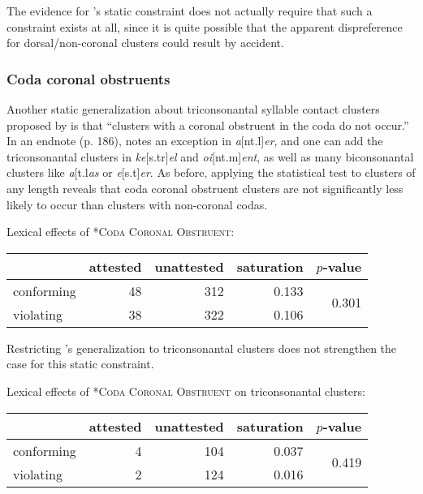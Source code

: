 \noindent
The evidence for \citeauthor{Pierrehumbert1994}'s static constraint does not actually require that such a constraint exists at all, since it is quite possible that the apparent dispreference for dorsal/non-coronal clusters could result by accident.

\subsubsection{Coda coronal obstruents}

Another static generalization about triconsonantal syllable contact clusters proposed by \citet[][175]{Pierrehumbert1994} is that  ``clusters with a coronal obstruent in the coda do not occur.'' In an endnote (p. 186), \citet{Pierrehumbert1994} notes an exception in \emph{a}[nt.l]\emph{er}, and one can add the triconsonantal clusters in \emph{ke}[s.tr]\emph{el} and \emph{oi}[nt.m]\emph{ent}, as well as many biconsonantal clusters like \emph{a}[t.l\emph{as} or \emph{e}[s.t]\emph{er}. As before, applying the statistical test to clusters of any length reveals that coda coronal obstruent clusters are not significantly less likely to occur than clusters with non-coronal codas. 

\begin{example}
Lexical effects of \textsc{*Coda Coronal Obstruent}: 

\vspace{0.5\baselineskip}
\begin{tabular}{l r r r r}
\toprule
           & attested & unattested & saturation & $p$-value \\
\midrule
conforming &  48 & 312 & 0.133 & \multirow{2}{*}{0.301} \\
violating  &  38 & 322 & 0.106 \\
\bottomrule
\end{tabular}
\end{example}

Restricting \citeauthor{Pierrehumbert1994}'s generalization to triconsonantal clusters does not strengthen the case for this static constraint.

\begin{example}
Lexical effects of \textsc{*Coda Coronal Obstruent} on triconsonantal clusters: 

\vspace{0.5\baselineskip}
\begin{tabular}{l r r r r}
\toprule
           & attested & unattested & saturation & $p$-value \\
\midrule
conforming &  4 & 104 & 0.037 & \multirow{2}{*}{0.419} \\
violating  &  2 & 124 & 0.016 \\
\bottomrule
\end{tabular} 
\end{example}

